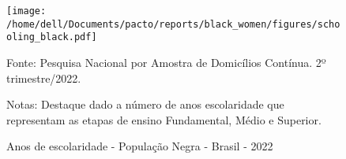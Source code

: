 \documentclass[12pt]{article}
\begin{document}
\begin{figure}[H]
    \centering
    \caption{Anos de escolaridade - População Negra - Brasil - 2022}
        \texttt{[image: /home/dell/Documents/pacto/reports/black\_women/figures/schooling\_black.pdf]}
    \label{fig:black_schooling}
    \begin{floatnotes}
        \item[Fonte:] Pesquisa Nacional por Amostra de Domicílios Contínua. 2º trimestre/2022.
        \item[Notas:] Destaque dado a número de anos escolaridade que representam as etapas de ensino Fundamental, Médio e Superior.
    \end{floatnotes}
\end{figure}

\printbibliography[title={Bibliografia}, nottype=misc]
\end{document}
